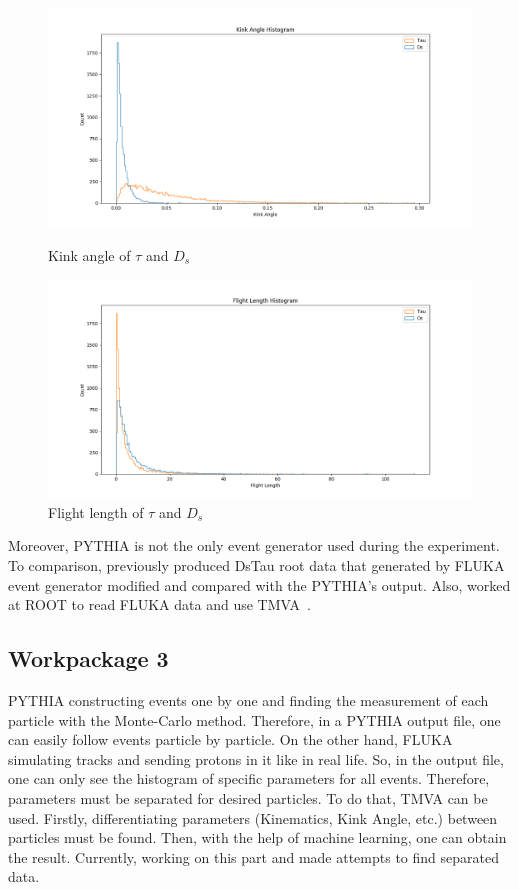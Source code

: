 \documentclass[12pt]{report}
\begin{document}
\begin{figure}[htp]

\centering
\includegraphics[width = \linewidth]{KinkAngle.png}
\caption{Kink angle of $\tau$ and $D_s$}
\label{fig:Kink}

\includegraphics[width = \linewidth]{FlightLength.png}
\caption{Flight length of $\tau$ and $D_s$}
\label{fig:Flight}

\end{figure}

Moreover, PYTHIA is not the only event generator used during the experiment. To comparison, previously produced DsTau root data that generated by FLUKA event generator modified and compared with the PYTHIA’s output. Also, worked at ROOT to read FLUKA data and use TMVA~\cite{hoecker}.

\subsection{Workpackage 3}
\label{sec:WP3}
PYTHIA constructing events one by one and finding the measurement of each particle with the Monte-Carlo method. Therefore, in a PYTHIA output file, one can easily follow events particle by particle. On the other hand, FLUKA simulating tracks and sending protons in it like in real life. So, in the output file, one can only see the histogram of specific parameters for all events. Therefore, parameters must be separated for desired particles. To do that, TMVA can be used. Firstly, differentiating parameters (Kinematics, Kink Angle, etc.) between particles must be found. Then, with the help of machine learning, one can obtain the result. Currently, working on this part and made attempts to find separated data.
\end{document}

